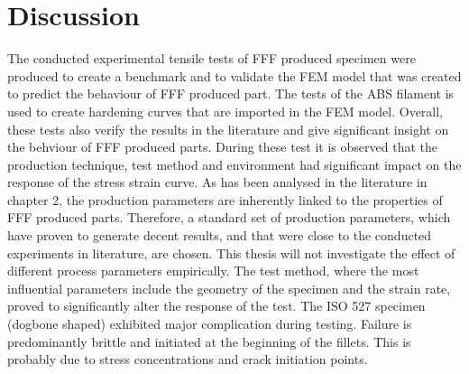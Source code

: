 \section{Discussion}
The conducted experimental tensile tests of FFF produced specimen were produced to create a benchmark and to validate the FEM model that was created to predict the behaviour of FFF produced part. The tests of the ABS filament is used to create hardening curves that are imported in the FEM model. Overall, these tests also verify the results in the literature and give significant insight on the behviour of FFF produced parts. 
During these test it is observed that the production technique, test method and environment had significant impact on the response of the stress strain curve. As has been analysed in the literature in chapter 2, the production parameters are inherently linked to the properties of FFF produced parts. Therefore, a standard set of production parameters, which have proven to generate decent results, and that were close to the conducted experiments in literature, are chosen. This thesis will not investigate the effect of different process parameters empirically. The test method, where the most influential  parameters include the geometry of the specimen and the strain rate, proved to significantly alter the response of the test. The ISO 527 specimen (dogbone shaped) exhibited major complication during testing. Failure is predominantly brittle and initiated at the beginning of the fillets. This is probably due to stress concentrations and crack initiation points. 

